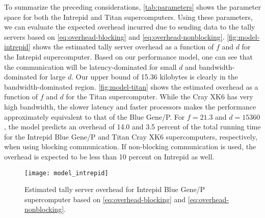 \documentclass[3p]{elsarticle}
\begin{document}
To summarize the preceding considerations, \autoref{tab:parameters} shows the
parameter space for both the Intrepid and Titan supercomputers. Using these
parameters, we can evaluate the expected overhead incurred due to sending data
to the tally servers based on \eqref{eq:overhead-blocking} and
\eqref{eq:overhead-nonblocking}. \autoref{fig:model-intrepid} shows the
estimated tally server overhead as a function of $f$ and $d$ for the Intrepid
supercomputer. Based on our performance model, one can see that the
communication will be latency-dominated for small $d$ and bandwidth-dominated
for large $d$. Our upper bound of 15.36 kilobytes is clearly in the
bandwidth-dominated region. \autoref{fig:model-titan} shows the estimated
overhead as a function of $f$ and $d$ for the Titan supercomputer. While the
Cray XK6 has very high bandwidth, the slower latency and faster processors makes
the performance approximately equivalent to that of the Blue Gene/P. For $f =
21.3$ and $d = 15360$, the model predicts an overhead of 14.0 and 3.5 percent of
the total running time for the Intrepid Blue Gene/P and Titan Cray XK6
supercomputers, respectively, when using blocking communication. If non-blocking
communication is used, the overhead is expected to be less than 10 percent on
Intrepid as well.

\begin{table}[htb]
\end{table}

\begin{figure}[htb]
  \centering
  \texttt{[image: model\_intrepid]}
  \caption{Estimated tally server overhead for Intrepid Blue Gene/P
    supercomputer based on \eqref{eq:overhead-blocking} and
    \eqref{eq:overhead-nonblocking}.}
  \label{fig:model-intrepid}
\end{figure}
\end{document}
